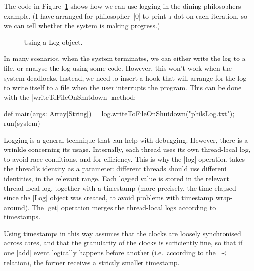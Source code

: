 The code in Figure~\ref{fig:dining-phils-log} shows how we can use logging in
the dining philosophers example.  (I have arranged for philosopher~|0| to
print a dot on each iteration, so we can tell whether the system is making
progress.)


\begin{figure}
\caption{Using a {\scalashape Log} object.}
\label{fig:dining-phils-log}
\end{figure}


In many scenarios, when the system terminates, we can either write the log to
a file, or analyse the log using some code.  However, this won't work when the
system deadlocks.  Instead, we need to insert a hook that will arrange for the
log to write itself to a file when the user interrupts the program.  This can
be done with the |writeToFileOnShutdown| method:
%
\begin{scala}
  def main(args: Array[String]) = {
    log.writeToFileOnShutdown("philsLog.txt"); run(system)
  }
\end{scala}

Logging is a general technique that can help with debugging.  However, there
is a wrinkle concerning its usage.
%
Internally, each thread uses its own thread-local log, to avoid race
conditions, and for efficiency.  This is why the |log| operation takes the
thread's identity as a parameter: different threads should use different
identities, in the relevant range.  Each logged value is stored in the
relevant thread-local log, together with a timestamp (more precisely, the
time elapsed since the |Log| object was created, to avoid problems with
timestamp wrap-around).
%
The |get| operation merges the thread-local logs according to
timestamps.

Using timestamps in this way assumes that the clocks are loosely synchronised
across cores, and that the granularity of the clocks is sufficiently fine, so
that if one |add| event logically happens before another (i.e.~according to
the~$\prec$ relation), the former receives a strictly smaller timestamp.

